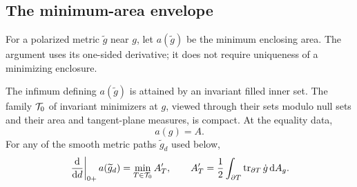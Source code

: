 \subsection{The minimum-area envelope}

For a polarized metric \(\widetilde g\) near \(g\), let \(a(\widetilde g)\)
be the minimum enclosing area. The argument uses its one-sided derivative;
it does not require uniqueness of a minimizing enclosure.

\begin{lemma}
\label{j:area}
The infimum defining \(a(\widetilde g)\) is attained by an invariant
filled inner set. The family \(\mathcal T_0\) of invariant minimizers at \(g\),
viewed through their sets modulo null sets and their area and tangent-plane
measures, is compact. At the equality data,
\[
 a(g)=A.
\]
For any of the smooth metric paths \(\widetilde g_d\) used below,
\begin{equation}
\label{j:envelope}
 \left.\frac{\mathrm d}{\mathrm d d}\right|_{0+}a(\widetilde g_d)
   =\min_{T\in\mathcal T_0} A'_T,\qquad
 A'_T=\frac12\int_{\partial T}\operatorname{tr}_{\partial T}\dot g\,\mathrm d A_g.
\end{equation}
\end{lemma}

